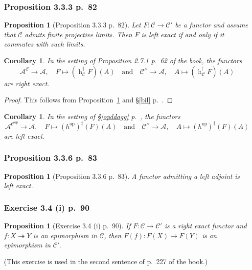 \documentclass[12pt]{article}
\newtheorem{prop}[thm]{Proposition}
\newtheorem{cor}[thm]{Corollary}
\theoremstyle{remark}
\theoremstyle{definition}
\newcommand{\oo}{\operatorname}
\newcommand{\A}{\mathcal A}
\newcommand{\C}{\mathcal C}
\newcommand{\epi}{\twoheadrightarrow}
\DeclareMathOperator{\op}{op}
\begin{document}
\subsubsection{Proposition 3.3.3 p.~82}

\begin{prop}[Proposition 3.3.3 p.~82]\label{333}
Let $F:\C\to\C'$ be a functor and assume that $\C$ admits finite projective limits. Then $F$ is left exact if and only if it commutes with such limits.
\end{prop}

\begin{cor}\label{bre}
In the setting of Proposition 2.7.1 p.~62 of the book, the functors
$$
\A^\C\to\A,\quad F\mapsto(\oo h_\C^\dagger F)(A)\quad\text{and}\quad
\C^\wedge\to\A,\quad A\mapsto(\oo h_\C^\dagger F)(A)
$$ 
are right exact. 
\end{cor}

\begin{proof}
This follows from Proposition~\ref{333} and \S\ref{bil} p.~\pageref{bil}.
\end{proof} 

\begin{cor}\label{bre2}
In the setting of \S\ref{opddagg} p.~\pageref{opddagg}, the functors
$$
\A^{\C^{\op}}\to\A,\quad F\mapsto(h^{\op})^\ddagger(F)(A)\quad\text{and}\quad
\C^\wedge\to\A,\quad A\mapsto(h^{\op})^\ddagger(F)(A)
$$ 
are left exact. 
\end{cor} 

\subsubsection{Proposition 3.3.6 p.~83}

\begin{prop}[Proposition 3.3.6 p.~83]\label{336}
A functor admitting a left adjoint is left exact.
\end{prop}

\subsubsection{Exercise 3.4 (i) p.~90}

\begin{prop}[Exercise 3.4 (i) p.~90]\label{34i}
If $F:\C\to\C'$ is a right exact functor and $f:X\epi Y$ is an epimorphism in $\C$, then $F(f):F(X)\to F(Y)$ is an epimorphism in $\C'$.
\end{prop}

(This exercise is used in the second sentence of p.~227 of the book.)
\end{document}
